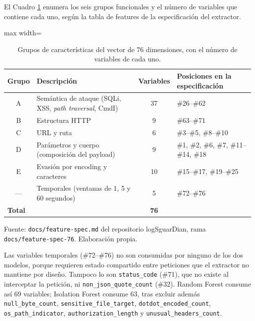 El Cuadro \ref{tabla:grupos-features} enumera los seis grupos funcionales y el número de variables que contiene cada uno, según la tabla de features de la especificación del extractor.

\begin{table}[htbp]
\centering
\footnotesize
\setlength{\tabcolsep}{3pt}
\begin{adjustbox}{max width=\linewidth}
\begin{tabular}{|c|p{5.6cm}|c|p{5.8cm}|}
\hline
\textbf{Grupo} & \textbf{Descripción} & \textbf{Variables} & \textbf{Posiciones en la especificación} \\ \hline
A & Semántica de ataque (SQLi, XSS, \textit{path traversal}, CmdI) & 37 & \#26--\#62 \\ \hline
B & Estructura HTTP & 9 & \#63--\#71 \\ \hline
C & URL y ruta & 6 & \#3--\#5, \#8--\#10 \\ \hline
D & Parámetros y cuerpo (composición del payload) & 9 & \#1, \#2, \#6, \#7, \#11--\#14, \#18 \\ \hline
E & Evasión por encoding y caracteres & 10 & \#15--\#17, \#19--\#25 \\ \hline
--- & Temporales (ventanas de 1, 5 y 60 segundos) & 5 & \#72--\#76 \\ \hline
\multicolumn{2}{|l|}{\textbf{Total}} & \textbf{76} & \\ \hline
\end{tabular}
\end{adjustbox}
\caption[Grupos de características del vector de 76 dimensiones]{Grupos de características del vector de 76 dimensiones, con el número de variables de cada uno.}
\label{tabla:grupos-features}
\par\smallskip\footnotesize Fuente: \texttt{docs/feature-spec.md} del repositorio logSguarDian, rama \texttt{docs/feature-spec-76}. Elaboración propia.
\end{table}

Las variables temporales (\#72--\#76) no son consumidas por ninguno de los dos modelos, porque requieren estado compartido entre peticiones que el extractor no mantiene por diseño. Tampoco lo son \texttt{status\_code} (\#71), que no existe al interceptar la petición, ni \texttt{non\_json\_quote\_count} (\#32). Random Forest consume así 69 variables; Isolation Forest consume 63, tras excluir además \texttt{null\_byte\_count}, \texttt{sensitive\_file\_target}, \texttt{dotdot\_encoded\_count}, \texttt{os\_path\_indicator}, \texttt{authorization\_length} y \texttt{unusual\_headers\_count}.

